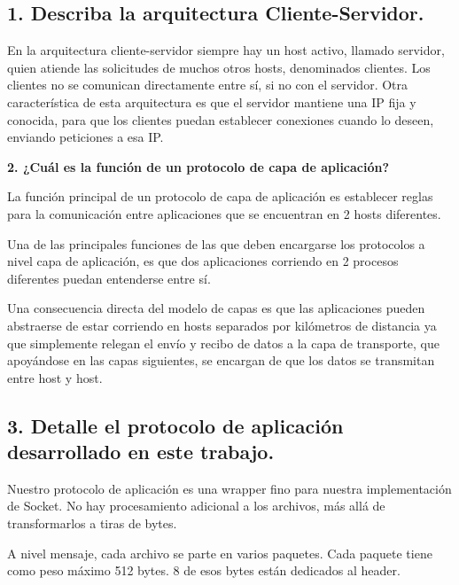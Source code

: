 \documentclass{article}
\begin{document}
\subsection{\texorpdfstring{\textbf{1. Describa la arquitectura Cliente-Servidor.}}{1. Describa la arquitectura Cliente-Servidor.}}\label{describa-la-arquitectura-cliente-servidor.}

En la arquitectura cliente-servidor siempre hay un host activo, llamado servidor, quien atiende las solicitudes de muchos otros hosts, denominados clientes. Los clientes no se comunican directamente entre sí, si no con el servidor. Otra característica de esta arquitectura es que el servidor mantiene una IP fija y conocida, para que los clientes puedan establecer conexiones cuando lo deseen, enviando peticiones a esa IP.

\textbf{2. ¿Cuál es la función de un protocolo de capa de aplicación?}

La función principal de un protocolo de capa de aplicación es establecer
reglas para la comunicación entre aplicaciones que se encuentran en 2
hosts diferentes.

Una de las principales funciones de las que deben encargarse los
protocolos a nivel capa de aplicación, es que dos aplicaciones corriendo
en 2 procesos diferentes puedan entenderse entre sí.

Una consecuencia directa del modelo de capas es que las aplicaciones
pueden abstraerse de estar corriendo en hosts separados por kilómetros
de distancia ya que simplemente relegan el envío y recibo de datos a la
capa de transporte, que apoyándose en las capas siguientes, se encargan
de que los datos se transmitan entre host y host.

\subsection{\texorpdfstring{\textbf{3. Detalle el protocolo de
aplicación desarrollado en este trabajo.}}{3. Detalle el protocolo de aplicación desarrollado en este trabajo.}}\label{detalle-el-protocolo-de-aplicaciuxf3n-desarrollado-en-este-trabajo.}

Nuestro protocolo de aplicación es una wrapper fino para nuestra implementación de Socket. No hay procesamiento adicional a los archivos, más allá de transformarlos a tiras de bytes.

A nivel mensaje, cada archivo se parte en varios paquetes. Cada paquete tiene como peso máximo 512 bytes. 8 de esos bytes están dedicados al header.
\end{document}
